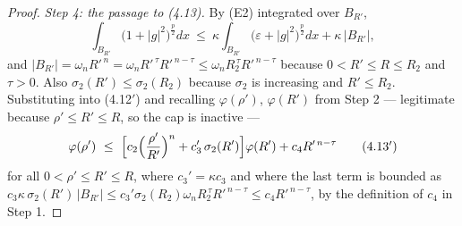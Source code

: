 \begin{proof}
\emph{Step 4: the passage to (4.13).}  By (E2) integrated over $B_{R'}$,
\[
\int_{B_{R'}}\bigl(1+|g|^2\bigr)^{\frac p2}dx
\ \le\ \kappa\int_{B_{R'}}\bigl(\varepsilon+|g|^2\bigr)^{\frac p2}dx+\kappa\,|B_{R'}| ,
\]
and $|B_{R'}|=\omega_nR'^{\,n}=\omega_nR'^{\,\tau}R'^{\,n-\tau}
\le\omega_nR_2^{\,\tau}R'^{\,n-\tau}$ because $0<R'\le R\le R_2$ and $\tau>0$.
Also $\sigma_2(R')\le\sigma_2(R_2)$ because $\sigma_2$ is increasing and
$R'\le R_2$.  Substituting into (4.12$'$) and recalling $\varphi(\rho')$,
$\varphi(R')$ from Step 2 --- legitimate because $\rho'\le R'\le R$, so the cap
is inactive ---
\[
\varphi(\rho')
\ \le\ \Bigl[c_2\Bigl(\frac{\rho'}{R'}\Bigr)^{n}+c_3'\,\sigma_2(R')\Bigr]\varphi(R')
+c_4R'^{\,n-\tau}
\tag{4.13$'$}
\]
for all $0<\rho'\le R'\le R$, where $c_3'=\kappa c_3$ and where the last term is
bounded as
$c_3\kappa\,\sigma_2(R')\,|B_{R'}|
\le c_3'\sigma_2(R_2)\omega_nR_2^{\,\tau}R'^{\,n-\tau}\le c_4R'^{\,n-\tau}$,
by the definition of $c_4$ in Step 1.


\end{proof}
